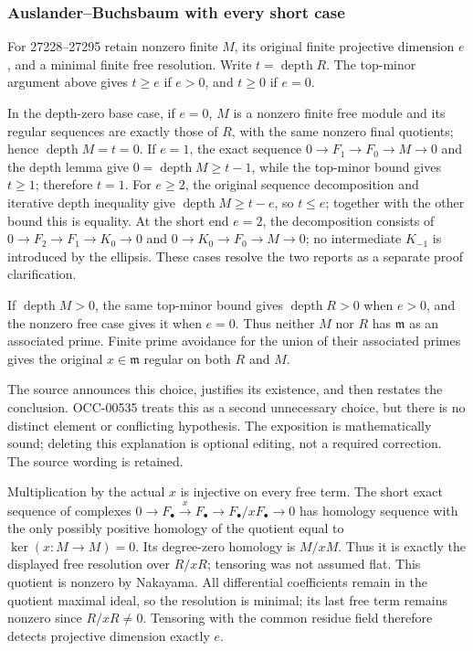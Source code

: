 \subsubsection{Auslander--Buchsbaum with every short case}\label{auslanderbuchsbaum-with-every-short-case}

For 27228--27295 retain nonzero finite \(M\), its original finite projective dimension \(e\), and a minimal finite free resolution. Write \(t=\operatorname{depth}R\). The top-minor argument above gives \(t\ge e\) if \(e>0\), and \(t\ge0\) if \(e=0\).

In the depth-zero base case, if \(e=0\), \(M\) is a nonzero finite free module and its regular sequences are exactly those of \(R\), with the same nonzero final quotients; hence \(\operatorname{depth}M=t=0\). If \(e=1\), the exact sequence \(0\to F_1\to F_0\to M\to0\) and the depth lemma give \(0=\operatorname{depth}M\ge t-1\), while the top-minor bound gives \(t\ge1\); therefore \(t=1\). For \(e\ge2\), the original sequence decomposition and iterative depth inequality give \(\operatorname{depth}M\ge t-e\), so \(t\le e\); together with the other bound this is equality. At the short end \(e=2\), the decomposition consists of \(0\to F_2\to F_1\to K_0\to0\) and \(0\to K_0\to F_0\to M\to0\); no intermediate \(K_{-1}\) is introduced by the ellipsis. These cases resolve the two reports as a separate proof clarification.

If \(\operatorname{depth}M>0\), the same top-minor bound gives \(\operatorname{depth}R>0\) when \(e>0\), and the nonzero free case gives it when \(e=0\). Thus neither \(M\) nor \(R\) has \(\mathfrak m\) as an associated prime. Finite prime avoidance for the union of their associated primes gives the original \(x\in\mathfrak m\) regular on both \(R\) and \(M\).

The source announces this choice, justifies its existence, and then restates the conclusion. OCC-00535 treats this as a second unnecessary choice, but there is no distinct element or conflicting hypothesis. The exposition is mathematically sound; deleting this explanation is optional editing, not a required correction. The source wording is retained.

Multiplication by the actual \(x\) is injective on every free term. The short exact sequence of complexes \(0\to F_\bullet\xrightarrow{x}F_\bullet\to F_\bullet/xF_\bullet\to0\) has homology sequence with the only possibly positive homology of the quotient equal to \(\ker(x:M\to M)=0\). Its degree-zero homology is \(M/xM\). Thus it is exactly the displayed free resolution over \(R/xR\); tensoring was not assumed flat. This quotient is nonzero by Nakayama. All differential coefficients remain in the quotient maximal ideal, so the resolution is minimal; its last free term remains nonzero since \(R/xR\ne0\). Tensoring with the common residue field therefore detects projective dimension exactly \(e\).

